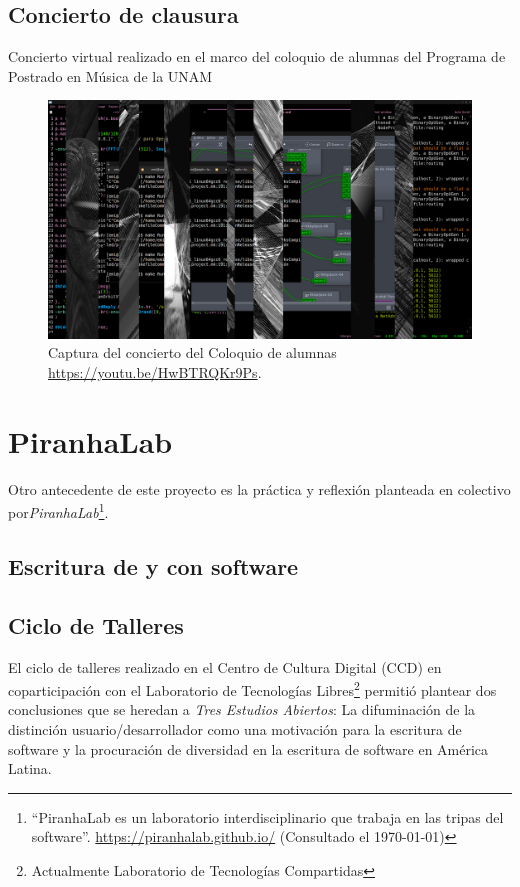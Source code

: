 \subsection{Concierto de clausura}

Concierto virtual realizado en el marco del coloquio de alumnas del Programa de Postrado en Música de la UNAM

\begin{figure}[tb]
\centering 
\includegraphics[width=\columnwidth]{img/col2.png} 
\caption[Concierto coloquio]{Captura del concierto del Coloquio de alumnas \url{https://youtu.be/HwBTRQKr9Ps}.} %
\label{fig:gallery} 
\end{figure}

\section{PiranhaLab}

Otro antecedente de este proyecto es la práctica y reflexión planteada en colectivo por\textit{PiranhaLab}\footnote{``PiranhaLab es un laboratorio interdisciplinario que trabaja en las tripas del software''. \url{https://piranhalab.github.io/} (Consultado el \today)}.

\subsection{Escritura de y con software}

\subsection{Ciclo de Talleres}

El ciclo de talleres realizado en el Centro de Cultura Digital (CCD) en coparticipación con el Laboratorio de Tecnologías Libres\footnote{Actualmente Laboratorio de Tecnologías Compartidas} permitió plantear dos conclusiones que se heredan a \textit{Tres Estudios Abiertos}: La difuminación de la distinción usuario/desarrollador como una motivación para la escritura de software y la procuración de diversidad en la escritura de software en América Latina.

